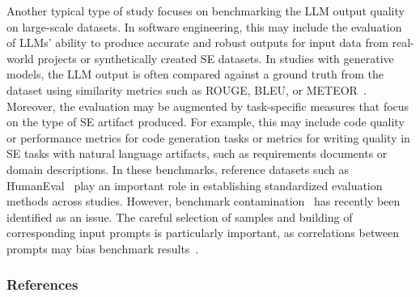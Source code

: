 \documentclass[11pt]{article}
\begin{document}
Another typical type of study focuses on benchmarking the LLM output quality on large-scale datasets.
In software engineering, this may include the evaluation of LLMs' ability to produce accurate and robust outputs for input data from real-world projects or synthetically created SE datasets.
In studies with generative models, the LLM output is often compared against a ground truth from the dataset using similarity metrics such as ROUGE, BLEU, or METEOR~\cite{10.1145/3695988}.
Moreover, the evaluation may be augmented by task-specific measures that focus on the type of SE artifact produced.
For example, this may include code quality or performance metrics for code generation tasks or metrics for writing quality in SE tasks with natural language artifacts, such as requirements documents or domain descriptions.
In these benchmarks, reference datasets such as HumanEval~\cite{DBLP:journals/corr/abs-2107-03374} play an important role in establishing standardized evaluation methods across studies.
However, benchmark contamination~\cite{DBLP:journals/corr/abs-2410-16186} has recently been identified as an issue.
The careful selection of samples and building of corresponding input prompts is particularly important, as correlations between prompts may bias benchmark results~\cite{DBLP:conf/acl/SiskaMAB24}.

\subsubsection{References}



\end{document}
